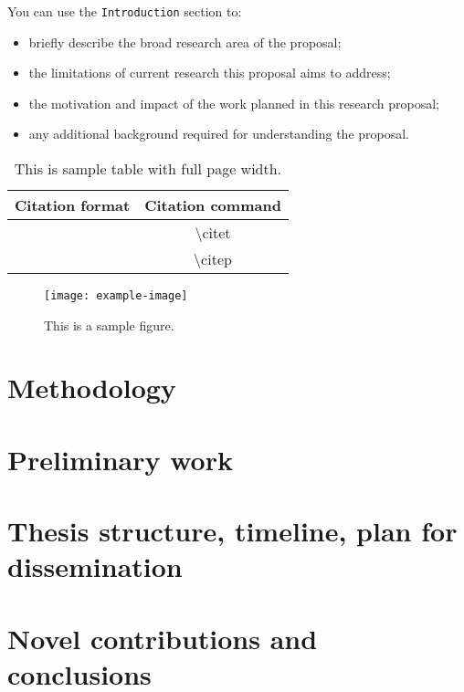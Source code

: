 \documentclass[10pt]{article}
\begin{document}
\begin{multicols*}{2}
You can use the \texttt{Introduction} section to:

\begin{itemize}
    \item briefly describe the broad research area of the proposal;
    \item the limitations of current research this proposal aims to address;
    \item the motivation and impact of the work planned in this research proposal;
    \item any additional background required for understanding the proposal.
\end{itemize}

\begin{table*}
        \centering
        \begin{tabular}{cc}
                \hline
                \textbf{Citation format} & \textbf{Citation command} \\
                \hline
                \citet{APA:83} & \textbackslash{}citet{} \\
                \citep{APA:83} & \textbackslash{}citep{} \\
                \hline
        \end{tabular}
        \caption{This is sample table with full page width.}
        \label{tbl:tbl1}
\end{table*}

\begin{figure}[H]
    \centering
        \texttt{[image: example-image]}
        \caption{This is a sample figure.}
        \label{fig:fig1}
\end{figure}

\section{Methodology}

\section{Preliminary work}

\section{Thesis structure, timeline, plan for dissemination}

\section{Novel contributions and conclusions}

\end{multicols*}

\clearpage



\end{document}

